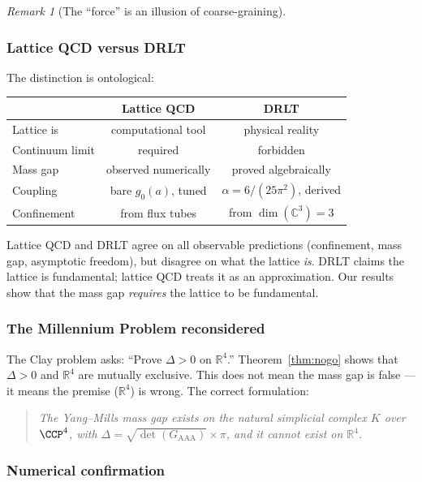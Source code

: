 \documentclass[12pt]{article}
\theoremstyle{remark}
\newtheorem{remark}[theorem]{Remark}
\theoremstyle{definition}
\newcommand{\CC}{\mathbb{C}}
\newcommand{\RR}{\mathbb{R}}
\begin{document}
\begin{remark}[The ``force'' is an illusion of coarse-graining]
\subsubsection{Lattice QCD versus DRLT}

The distinction is ontological:

\begin{center}
\begin{tabular}{lcc}
\hline
& Lattice QCD & DRLT \\
\hline
Lattice is & computational tool & physical reality \\
Continuum limit & required & forbidden \\
Mass gap & observed numerically & proved algebraically \\
Coupling & bare $g_0(a)$, tuned & $\alpha = 6/(25\pi^2)$, derived \\
Confinement & from flux tubes & from $\dim(\CC^3) = 3$ \\
\hline
\end{tabular}
\end{center}

\noindent
Lattice QCD and DRLT agree on all observable predictions (confinement,
mass gap, asymptotic freedom), but disagree on what the lattice \emph{is}.
DRLT claims the lattice is fundamental; lattice QCD treats it as an
approximation. Our results show that the mass gap \emph{requires}
the lattice to be fundamental.

\subsubsection{The Millennium Problem reconsidered}

The Clay problem asks: ``Prove $\Delta > 0$ on $\RR^4$.''
Theorem~\ref{thm:nogo} shows that $\Delta > 0$ and $\RR^4$ are
mutually exclusive. This does not mean the mass gap is false --- it
means the premise ($\RR^4$) is wrong. The correct formulation:

\begin{quote}
\emph{The Yang--Mills mass gap exists on the natural simplicial complex
$K$ over $\CCP^4$, with $\Delta = \sqrt{\det(G_{\mathrm{AAA}})}
\times \pi$, and it cannot exist on $\RR^4$.}
\end{quote}

\subsubsection{Numerical confirmation}


\end{remark}
\end{document}
